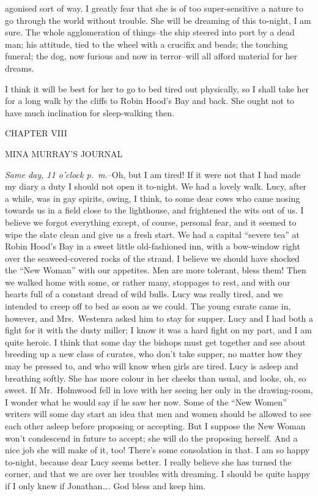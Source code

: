 \documentclass[12pt,openright]{book}
\begin{document}
agonised sort of way. I greatly fear that she is of too super-sensitive a nature to go through the world without trouble. She will be dreaming of this to-night, I am sure. The whole agglomeration of things–the ship steered into port by a dead man; his attitude, tied to the wheel with a crucifix and beads; the touching funeral; the dog, now furious and now in terror–will all afford material for her dreams.

I think it will be best for her to go to bed tired out physically, so I shall take her for a long walk by the cliffs to Robin Hood’s Bay and back. She ought not to have much inclination for sleep-walking then.

CHAPTER VIII

MINA MURRAY’S JOURNAL

\textit{Same day, 11 o’clock p. m.}–Oh, but I am tired! If it were not that I had made my diary a duty I should not open it to-night. We had a lovely walk. Lucy, after a while, was in gay spirits, owing, I think, to some dear cows who came nosing towards us in a field close to the lighthouse, and frightened the wits out of us. I believe we forgot everything except, of course, personal fear, and it seemed to wipe the slate clean and give us a fresh start. We had a capital “severe tea” at Robin Hood’s Bay in a sweet little old-fashioned inn, with a bow-window right over the seaweed-covered rocks of the strand. I believe we should have shocked the “New Woman” with our appetites. Men are more tolerant, bless them! Then we walked home with some, or rather many, stoppages to rest, and with our hearts full of a constant dread of wild bulls. Lucy was really tired, and we intended to creep off to bed as soon as we could. The young curate came in, however, and Mrs. Westenra asked him to stay for supper. Lucy and I had both a fight for it with the dusty miller; I know it was a hard fight on my part, and I am quite heroic. I think that some day the bishops must get together and see about breeding up a new class of curates, who don’t take supper, no matter how they may be pressed to, and who will know when girls are tired. Lucy is asleep and breathing softly. She has more colour in her cheeks than usual, and looks, oh, so sweet. If Mr. Holmwood fell in love with her seeing her only in the drawing-room, I wonder what he would say if he saw her now. Some of the “New Women” writers will some day start an idea that men and women should be allowed to see each other asleep before proposing or accepting. But I suppose the New Woman won’t condescend in future to accept; she will do the proposing herself. And a nice job she will make of it, too! There’s some consolation in that. I am so happy to-night, because dear Lucy seems better. I really believe she has turned the corner, and that we are over her troubles with dreaming. I should be quite happy if I only knew if Jonathan…. God bless and keep him.
\end{document}
